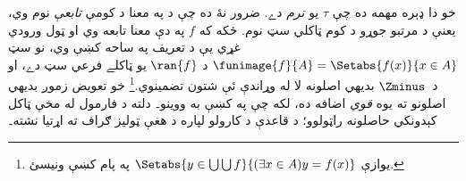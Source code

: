 \documentclass[../../../include/open-logic-section]{subfiles}
\begin{document}
خو دا ډېره مهمه ده چې $\tau$ يو \emph{ترم} دے. ضرور نۀ ده چې د
 په معنا د کومې \emph{تابعې} نوم وي، يعنې د
مرتبو جوړو د کوم ټاکلي سټ نوم. ځکه که $f$ په دې معنا تابعه وي او ټول ورودي غړي يې د تعريف په ساحه
کښې وي، نو سټ
$\funimage{f}{A} = \Setabs{f(x)}{x \in
A}$ د $\ran{f}$ يو ټاکلے فرعي سټ دے، او د~$\Zminus$ بديهي
اصلونه لا له وړاندې ئې شتون تضمينوي.\footnote{يوازې
$\Setabs{y \in \bigcup \bigcup f}{(\exists x \in A)y =
f(x)}$ په پام کښې ونيسئ.} خو تعويض زموږ بديهي اصلونو ته يوه
\emph{قوي} اضافه ده، لکه چې په  کښې به ووينو۔
دلته د فارمول له مخې ټاکل کېدونکي حاصلونه راټولوو؛ د قاعدې
د کارولو لپاره د هغې ټوليز ګراف ته اړتيا نشته۔
\end{document}
